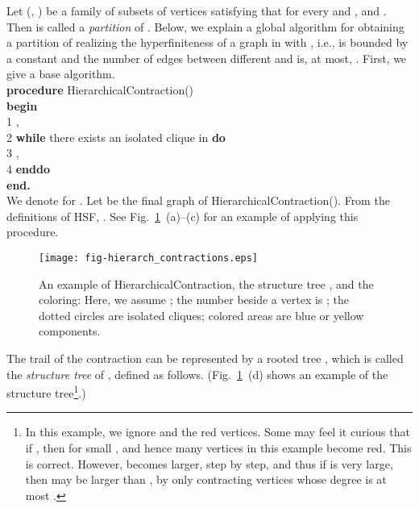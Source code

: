 \documentclass[11pt]{article}
\begin{document}
Let  (, ) 
be a family of subsets of vertices satisfying that 
 for every  and , 
and . 
Then  is called 
a {\em partition} of . 
Below, we explain a global algorithm for obtaining a partition of  realizing the hyperfiniteness 
of a graph in  with , i.e., 
 is bounded by a constant and the number of edges between different  and  is, 
at most, . 
First, we give a base algorithm. \\




\noindent
\textbf{procedure} {\sc HierarchicalContraction}()\\
\textbf{begin}\\
1 \hspace{1em} , \\
2 \hspace{1em} \textbf{while} 
there exists an isolated clique in  \textbf{do}\\
3 \hspace{2em} , \\
4 \hspace{1em} \textbf{enddo}\\
\textbf{end.}\\


We denote  for . 
Let  be the final graph of {\sc HierarchicalContraction}(). 
From the definitions of HSF, 
. 
See Fig.~\ref{fg:fig-hierarch_contractions}~(a)--(c) for 
an example of applying this procedure. 
\begin{figure}[bht]
\begin{center}
\texttt{[image: fig-hierarch\_contractions.eps]}
\end{center}
\caption{An example of {\sc HierarchicalContraction}, the structure tree , and the coloring: 
Here, we assume ; 
the number beside a vertex is ; 
the dotted circles are isolated cliques; 
colored areas are blue or yellow components.}
\label{fg:fig-hierarch_contractions}
\end{figure}


The trail of the contraction can be represented by a rooted tree , 
which is called the {\em structure tree} of ,  
defined as follows.  
(Fig.~\ref{fg:fig-hierarch_contractions}~(d) shows 
an example of the structure tree\footnote{
In this example, we ignore  and the red vertices. Some may feel it curious that if , then  for small , 
and hence many vertices in this example become red. 
This is correct. However,  becomes larger, step by step, and thus 
if  is very large, then  may be larger 
than , by only contracting 
vertices whose degree is at most . 
}.)
\end{document}
